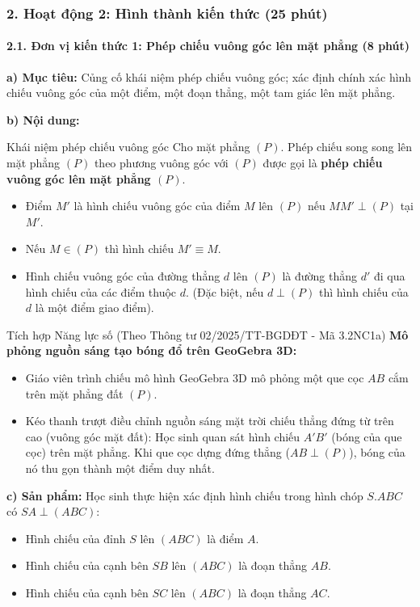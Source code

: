 \documentclass[12pt, a4paper]{article}
\begin{document}
\subsubsection*{2. Hoạt động 2: Hình thành kiến thức (25 phút)}

\paragraph{2.1. Đơn vị kiến thức 1: Phép chiếu vuông góc lên mặt phẳng (8 phút)}

\noindent \textbf{a) Mục tiêu:}
Củng cố khái niệm phép chiếu vuông góc; xác định chính xác hình chiếu vuông góc của một điểm, một đoạn thẳng, một tam giác lên mặt phẳng.

\noindent \textbf{b) Nội dung:}
\begin{pedabox}{Khái niệm phép chiếu vuông góc}
Cho mặt phẳng $(P)$. Phép chiếu song song lên mặt phẳng $(P)$ theo phương vuông góc với $(P)$ được gọi là \textbf{phép chiếu vuông góc lên mặt phẳng $(P)$}.
\begin{itemize}[leftmargin=0.6cm]
    \item Điểm $M'$ là hình chiếu vuông góc của điểm $M$ lên $(P)$ nếu $MM' \perp (P)$ tại $M'$.
    \item Nếu $M \in (P)$ thì hình chiếu $M' \equiv M$.
    \item Hình chiếu vuông góc của đường thẳng $d$ lên $(P)$ là đường thẳng $d'$ đi qua hình chiếu của các điểm thuộc $d$. (Đặc biệt, nếu $d \perp (P)$ thì hình chiếu của $d$ là một điểm giao điểm).
\end{itemize}
\end{pedabox}

\begin{aibox}{Tích hợp Năng lực số (Theo Thông tư 02/2025/TT-BGDĐT - Mã 3.2NC1a)}
\textbf{Mô phỏng nguồn sáng tạo bóng đổ trên GeoGebra 3D:}
\begin{itemize}[leftmargin=0.6cm]
    \item Giáo viên trình chiếu mô hình GeoGebra 3D mô phỏng một que cọc $AB$ cắm trên mặt phẳng đất $(P)$.
    \item Kéo thanh trượt điều chỉnh nguồn sáng mặt trời chiếu thẳng đứng từ trên cao (vuông góc mặt đất): Học sinh quan sát hình chiếu $A'B'$ (bóng của que cọc) trên mặt phẳng. Khi que cọc dựng đứng thẳng ($AB \perp (P)$), bóng của nó thu gọn thành một điểm duy nhất.
\end{itemize}
\end{aibox}

\noindent \textbf{c) Sản phẩm:}
Học sinh thực hiện xác định hình chiếu trong hình chóp $S.ABC$ có $SA \perp (ABC)$:
\begin{itemize}
    \item Hình chiếu của đỉnh $S$ lên $(ABC)$ là điểm $A$.
    \item Hình chiếu của cạnh bên $SB$ lên $(ABC)$ là đoạn thẳng $AB$.
    \item Hình chiếu của cạnh bên $SC$ lên $(ABC)$ là đoạn thẳng $AC$.
\end{itemize}
\end{document}

